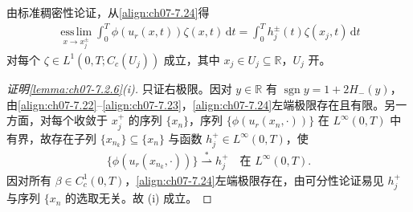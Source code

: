 \documentclass[../../main.tex]{subfiles}%
\begin{document}
\begin{remark}\label{remark:ch07-7.2.3}
由标准稠密性论证，从\eqref{align:ch07-7.24}得
\begin{align}
\operatorname*{ess\,lim}_{x\to x_j^\pm}\int_0^T\phi(u_r(x,t))\zeta(x,t)\,\mathrm{d}t
=\int_0^T h_j^\pm(t)\zeta(x_j,t)\,\mathrm{d}t \label{align:ch07-7.26}
\end{align}
对每个 $\zeta\in L^1(0,T;C_c(U_j))$ 成立，其中 $x_j\in U_j\subseteq\mathbb{R}$，$U_j$ 开。
\end{remark}

\begin{proof}[证明\cref{lemma:ch07-7.2.6}(i)]
只证右极限。因对 $y\in\mathbb{R}$ 有 $\operatorname{sgn}y=1+2H_-(y)$，由\eqref{align:ch07-7.22}--\eqref{align:ch07-7.23}，\eqref{align:ch07-7.24}左端极限存在且有限。另一方面，对每个收敛于 $x_j^+$ 的序列 $\{x_n\}$，序列 $\{\phi(u_r(x_n,\cdot))\}$ 在 $L^\infty(0,T)$ 中有界，故存在子列 $\{x_{n_k}\}\subseteq\{x_n\}$ 与函数 $h_j^+\in L^\infty(0,T)$，使
\begin{align*}
\{\phi(u_r(x_{n_k},\cdot))\}\stackrel{*}{\rightharpoonup}h_j^+\quad\text{在 }L^\infty(0,T).
\end{align*}
因对所有 $\beta\in C^1_c(0,T)$，\eqref{align:ch07-7.24}左端极限存在，由可分性论证易见 $h_j^+$ 与序列 $\{x_n$ 的选取无关。故 (i) 成立。


\end{proof}
\end{document}
